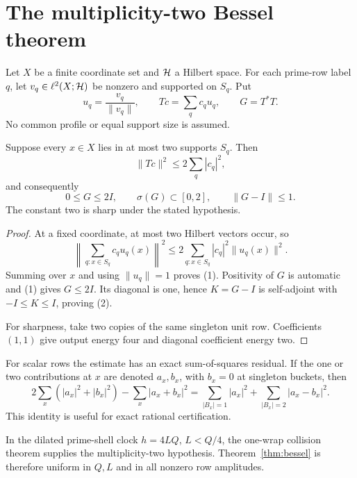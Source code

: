\section{The multiplicity-two Bessel theorem}

Let $X$ be a finite coordinate set and $\mathcal H$ a Hilbert space.  For each prime-row
label $q$, let $v_q\in\ell^2(X;\mathcal H)$ be nonzero and supported on $S_q$.  Put
\[
 u_q=\frac{v_q}{\|v_q\|},
 \qquad Tc=\sum_qc_qu_q,
 \qquad G=T^*T.
\]
No common profile or equal support size is assumed.

\begin{theorem}\label{thm:bessel}
Suppose every $x\in X$ lies in at most two supports $S_q$.  Then
\[
 \|Tc\|^2\le2\sum_q|c_q|^2, \tag{1}
\]
and consequently
\[
 0\le G\le2I,
 \qquad \sigma(G)\subset[0,2],
 \qquad \|G-I\|\le1. \tag{2}
\]
The constant two is sharp under the stated hypothesis.
\end{theorem}

\begin{proof}
At a fixed coordinate, at most two Hilbert vectors occur, so
\[
 \left\|\sum_{q:x\in S_q}c_qu_q(x)\right\|^2
 \le2\sum_{q:x\in S_q}|c_q|^2\|u_q(x)\|^2.
\]
Summing over $x$ and using $\|u_q\|=1$ proves (1).  Positivity of $G$ is automatic
and (1) gives $G\le2I$.  Its diagonal is one, hence $K=G-I$ is self-adjoint with
$-I\le K\le I$, proving (2).

For sharpness, take two copies of the same singleton unit row.  Coefficients $(1,1)$
give output energy four and diagonal coefficient energy two.
\end{proof}

For scalar rows the estimate has an exact sum-of-squares residual.  If the one or two
contributions at $x$ are denoted $a_x,b_x$, with $b_x=0$ at singleton buckets, then
\[
 2\sum_x(|a_x|^2+|b_x|^2)-\sum_x|a_x+b_x|^2
 =\sum_{|B_x|=1}|a_x|^2+\sum_{|B_x|=2}|a_x-b_x|^2. \tag{3}
\]
This identity is useful for exact rational certification.

In the dilated prime-shell clock $h=4LQ$, $L<Q/4$, the one-wrap collision theorem
supplies the multiplicity-two hypothesis.  Theorem~\ref{thm:bessel} is therefore
uniform in $Q,L$ and in all nonzero row amplitudes.

